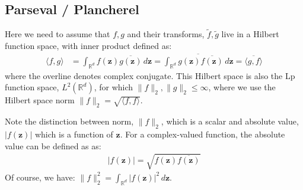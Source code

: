 \documentclass[a4paper,oneside,12pt,english]{report}
\def\zvec{\mathbf{z}}
\DeclareMathOperator{\abs}{abs}
\def\R{\mathbb{R}}
\def\conj#1{\overline{#1}}
\begin{document}
\subsection{Parseval / Plancherel}
\def\dotp#1#2{\langle#1,#2\rangle}
\def\norm#1{\lVert#1\rVert_2}
\def\abs#1{\lvert#1\rvert}
Here we need to assume that $f,g$ and their transforms, $\tilde f,\tilde g$ live in a Hilbert function space, with inner product defined as:
\begin{align}
\dotp{f}{g} &= \int_{\R^d} f(\zvec)\conj{g(\zvec)} \,d\zvec
= \conj{\int_{\R^d} g(\zvec)\conj{f(\zvec)} \,d\zvec} = \conj{\dotp{g}{f}}
\end{align}
where the overline denotes complex conjugate. This Hilbert space is also the Lp function space, $L^2(\R^d)$, for which $\norm{f},\norm{g}\le\infty$, where we use the Hilbert space norm $\norm{f}=\sqrt{\dotp{f}{f}}$.

Note the distinction between norm, $\norm{f}$, which is a scalar and absolute value, $\abs{f(\zvec)}$ which is a function of $\zvec$. For a complex-valued function, the absolute value can be defined as as:
\begin{align}
\abs{f(\zvec)}=\sqrt{f(\zvec)\conj{f(\zvec)}}
\end{align}
Of course, we have: $\norm{f}^2=\int_{\R^d}\abs{f(\zvec)}^2\,d\zvec$.\\
\end{document}
